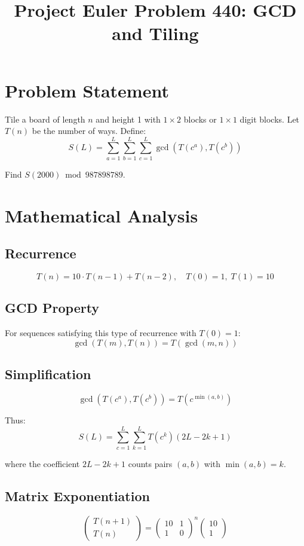 \documentclass[12pt]{article}
\title{Project Euler Problem 440: GCD and Tiling}
\author{}
\date{}
\begin{document}
\maketitle

\section{Problem Statement}
Tile a board of length $n$ and height 1 with $1 \times 2$ blocks or $1 \times 1$ digit blocks. Let $T(n)$ be the number of ways. Define:
\[
S(L) = \sum_{a=1}^{L}\sum_{b=1}^{L}\sum_{c=1}^{L} \gcd(T(c^a), T(c^b))
\]

Find $S(2000) \bmod 987898789$.

\section{Mathematical Analysis}

\subsection{Recurrence}
\[
T(n) = 10 \cdot T(n-1) + T(n-2), \quad T(0) = 1,\; T(1) = 10
\]

\subsection{GCD Property}
For sequences satisfying this type of recurrence with $T(0) = 1$:
\[
\gcd(T(m), T(n)) = T(\gcd(m, n))
\]

\subsection{Simplification}
\[
\gcd(T(c^a), T(c^b)) = T(c^{\min(a,b)})
\]

Thus:
\[
S(L) = \sum_{c=1}^{L} \sum_{k=1}^{L} T(c^k)(2L - 2k + 1)
\]

where the coefficient $2L - 2k + 1$ counts pairs $(a,b)$ with $\min(a,b) = k$.

\subsection{Matrix Exponentiation}
\[
\begin{pmatrix} T(n+1) \\ T(n) \end{pmatrix} = \begin{pmatrix} 10 & 1 \\ 1 & 0 \end{pmatrix}^n \begin{pmatrix} 10 \\ 1 \end{pmatrix}
\]
\end{document}
